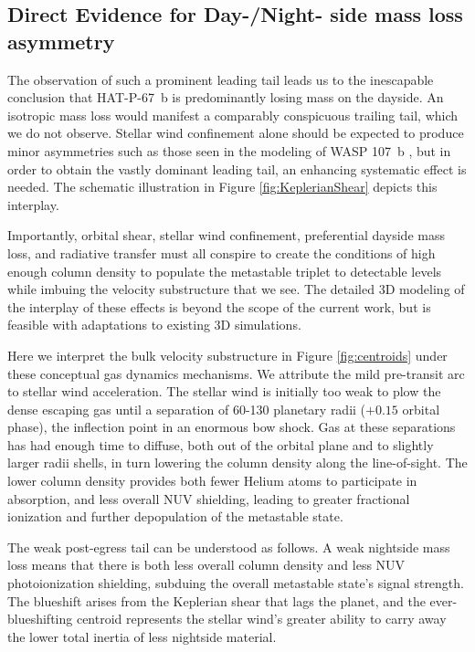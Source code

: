 \documentclass[twocolumn]{aastex631}
\begin{document}
\subsection{Direct Evidence for Day-/Night- side mass loss asymmetry}\label{secPrimaFacie}
The observation of such a prominent leading tail leads us to the inescapable conclusion that HAT-P-67~b is predominantly losing mass on the dayside.  An isotropic mass loss would manifest a comparably conspicuous trailing tail, which we do not observe.  Stellar wind confinement alone should be expected to produce minor asymmetries such as those seen in the modeling of WASP 107~b \citep{2022ApJ...926..226M}, but in order to obtain the vastly dominant leading tail, an enhancing systematic effect is needed.  The schematic illustration in Figure \ref{fig:KeplerianShear} depicts this interplay.

Importantly, orbital shear, stellar wind confinement, preferential dayside mass loss, and radiative transfer must all conspire to create the conditions of high enough column density to populate the  metastable triplet to detectable levels while imbuing the velocity substructure that we see.  The detailed 3D modeling of the interplay of these effects is beyond the scope of the current work, but is feasible with adaptations to existing 3D simulations.

Here we interpret the bulk velocity substructure in Figure \ref{fig:centroids} under these conceptual gas dynamics mechanisms.  We attribute the mild pre-transit arc to stellar wind acceleration.  The stellar wind is initially too weak to plow the dense escaping gas until a separation of 60-130 planetary radii ($+0.15$ orbital phase), the inflection point in an enormous bow shock.  Gas at these separations has had enough time to diffuse, both out of the orbital plane and to slightly larger radii shells, in turn lowering the column density along the line-of-sight.  The lower column density provides both fewer Helium atoms to participate in absorption, and less overall NUV shielding, leading to greater fractional ionization and further depopulation of the  metastable state.

The weak post-egress tail can be understood as follows.  A weak nightside mass loss means that there is both less overall column density and less NUV photoionization shielding, subduing the overall  metastable state's signal strength.  The blueshift arises from the Keplerian shear that lags the planet, and the ever-blueshifting centroid represents the stellar wind's greater ability to carry away the lower total inertia of less nightside material.
\end{document}
